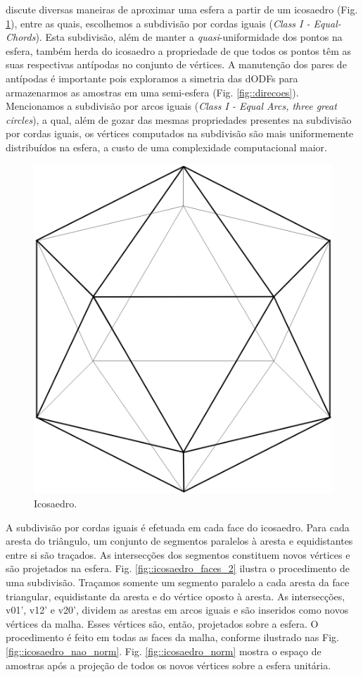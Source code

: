 \documentclass[
    12pt,                %
    oneside,            %
    a4paper,            %
    english,            %
    french,                %
    spanish,            %
    brazil                %
    ]{abntex2}
\begin{document}
 
 discute diversas maneiras de aproximar uma esfera a partir de um icosaedro (Fig. \ref{fig::icosaedro}), entre as quais, escolhemos a subdivisão por cordas iguais  (\textit{Class I - Equal-Chords}). Esta subdivisão, além de manter a \textit{quasi}-uniformidade dos pontos na esfera, também herda do icosaedro a propriedade de que todos os pontos têm as suas respectivas antípodas no conjunto de vértices. A manutenção dos pares de antípodas é importante pois exploramos a simetria das dODFs para armazenarmos as amostras em uma semi-esfera (Fig. \ref{fig::direcoes}). Mencionamos a subdivisão por arcos iguais (\textit{Class I - Equal Arcs, three great circles}), a qual, além de gozar das mesmas propriedades presentes na subdivisão por cordas iguais, os vértices computados na subdivisão são mais uniformemente distribuídos na esfera, a custo de uma complexidade computacional maior.

\begin{figure}[H]
    \centering
    \includegraphics[width=.3\linewidth, angle=0]{figs/HARDI/icosaedro.png}
    \caption{
    Icosaedro.
    }
    \label{fig::icosaedro}
   \hspace{1pt}
\end{figure}

A subdivisão por cordas iguais é efetuada em cada face do icosaedro. Para cada aresta do triângulo, um conjunto de segmentos paralelos à aresta e equidistantes entre si são traçados. As intersecções dos segmentos constituem novos vértices e são projetados na esfera. Fig. \ref{fig::icosaedro_faces_2} ilustra o procedimento de uma subdivisão. Traçamos somente um segmento paralelo a cada aresta da face triangular, equidistante da aresta e do vértice oposto à aresta. As intersecções, v01', v12' e v20', dividem as arestas em arcos iguais e são inseridos como novos vértices da malha. Esses vértices são, então, projetados sobre a esfera. O procedimento é feito em todas as faces da malha, conforme ilustrado nas Fig.\ref{fig::icosaedro_nao_norm}. Fig. \ref{fig::icosaedro_norm} mostra o espaço de amostras após a projeção de todos os novos vértices sobre a esfera unitária.
\end{document}
